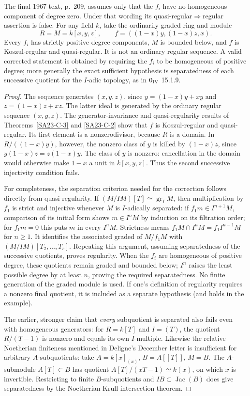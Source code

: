 \begin{example}\label{SA23-D-6}
The final 1967 text, p.~209, assumes only that the $f_i$ have no
homogeneous component of degree zero.  Under that wording its
quasi-regular$\Rightarrow$regular assertion is false.  For any field
$k$, take the ordinarily graded ring and module
\[
 R=M=k[x,y,z],\qquad f=((1-x)y,(1-x)z,x).
\]
Every $f_i$ has strictly positive degree components, $M$ is bounded
below, and $f$ is Koszul-regular and quasi-regular.  It is not an
ordinary regular sequence.  A valid corrected statement is obtained
by requiring the $f_i$ to be homogeneous of positive degree; more
generally the exact sufficient hypothesis is separatedness of each
successive quotient for the $I$-adic topology, as in
$0_{\rm IV}$ 15.1.9.
\end{example}
\begin{proof}
The sequence generates $(x,y,z)$, since
$y=(1-x)y+xy$ and $z=(1-x)z+xz$.  The latter ideal is generated
by the ordinary regular sequence $(x,y,z)$.  The generator-invariance
and quasi-regularity results of
Theorems~\ref{SA23-C-3} and \ref{SA23-C-2} show that $f$ is
Koszul-regular and quasi-regular.  Its first element is a
nonzerodivisor, because $R$ is a domain.  In
$R/((1-x)y)$, however, the nonzero class of $y$ is killed by
$(1-x)z$, since $y(1-x)z=z(1-x)y$.
The class of $y$ is nonzero: cancellation in the domain would
otherwise make $1-x$ a unit in $k[x,y,z]$.  Thus the second
successive injectivity condition fails.

For completeness, the separation criterion needed for the correction
follows directly from quasi-regularity.  If
$(M/IM)[T]\simeq\operatorname{gr}_I M$, then multiplication by
$f_1$ is strict and injective whenever $M$ is $I$-adically separated:
if $f_1m\in I^{n+1}M$, comparison of its initial form shows
$m\in I^nM$ by induction on its filtration order; for
$f_1m=0$ this puts $m$ in every $I^nM$.  Strictness means
$f_1M\cap I^nM=f_1 I^{n-1}M$ for $n\geq1$.
It identifies the associated graded of $M/f_1M$ with
$(M/IM)[T_2,\ldots,T_r]$.  Repeating this argument, assuming
separatedness of the successive quotients, proves regularity.
When the $f_i$ are homogeneous of positive degree, these quotients
remain graded and bounded below; $I^n$ raises the least possible
degree by at least $n$, proving the required separatedness.
No finite generation of the graded module is used.  If one's
definition of regularity requires a nonzero final quotient, it is
included as a separate hypothesis (and holds in the example).

The earlier, stronger claim that \emph{every} subquotient is separated
also fails even with homogeneous generators: for $R=k[T]$ and
$I=(T)$, the quotient $R/(T-1)$ is nonzero and equals its own
$I$-multiple.  Likewise the relative Noetherian finiteness mentioned
in Deligne's December letter is insufficient for arbitrary
$A$-subquotients: take $A=k[x]_{(x)}$, $B=A[[T]]$, $M=B$.
The $A$-submodule $A[T]\subset B$ has quotient
$A[T]/(xT-1)\simeq k(x)$, on which $x$ is invertible.  Restricting
to finite $B$-subquotients and $IB\subset\operatorname{Jac}(B)$
does give separatedness by the Noetherian Krull intersection theorem.
\end{proof}
